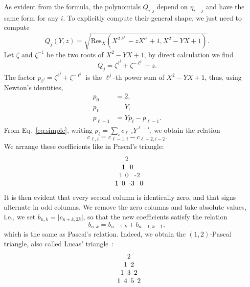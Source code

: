 \documentclass{sig-alternate}
\begin{document}
As evident from the formula, the polynomials $Q_{i,j}$ depend on
$\eta_{i-j}$ and have the same form for any $i$. To explicitly compute
their general shape, we just need to compute
\begin{equation}
  Q_j(Y, z) = \sqrt{\mathrm{Res}_X(X^{2\ell^j}-zX^{\ell^j}+1, X^2-YX+1)}.
\end{equation}
Let $\zeta$ and $\zeta^{-1}$ be the two roots of $X^2-YX+1$, by direct
calculation we find
\begin{equation}
  Q_j = \zeta^{\ell^j} + \zeta^{-\ell^j} - z.
\end{equation}
The factor $p_{\ell^j}=\zeta^{\ell^j} + \zeta^{-\ell^j}$ is the $\ell^j$-th power sum
of $X^2-YX+1$, thus, using Newton's identities,
\begin{equation}
  \label{eq:simple}
  \begin{aligned}
    p_0 &= 2,\\
    p_1 &= Y,\\
    p_{\ell+1} &= Yp_{\ell} - p_{\ell-1}.
  \end{aligned}
\end{equation}
From Eq.~\eqref{eq:simple}, writing $p_\ell = \sum_i
c_{\ell,i}Y^{\ell-i}$, we obtain the relation
\begin{equation}
  c_{\ell,i} = c_{\ell-1,i} - c_{\ell-2,i-2}.
\end{equation}
We arrange these coefficients like in Pascal's triangle:
\begin{equation}
  \begin{tabular}{*{8}{c@{}}}
    &&&2\\
    &&1&&0\\
    &1&&0&&-2\\
    1&&0&&-3&&0
  \end{tabular}
\end{equation}
It is then evident that every second column is identically zero, and
that signs alternate in odd columns. We remove the zero columns and
take absolute values, i.e., we set $b_{n,k}=\lvert c_{n+k,2k}\rvert$, so
that the new coefficients satisfy the relation
\begin{equation}
  b_{n,k} = b_{n-1,k} + b_{n-1,k-1},
\end{equation}
which is the same as Pascal's relation. Indeed, we obtain the
$(1,2)$-Pascal triangle, also called Lucas' triangle~\cite{benjamin10}:
\begin{equation}
  \begin{tabular}{*{8}{c@{}}}
    &&&2\\
    &&1&&2\\
    &1&&3&&2\\
    1&&4&&5&&2
  \end{tabular}
\end{equation}
\end{document}
